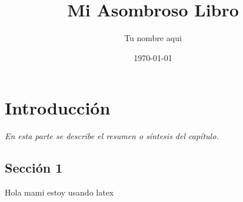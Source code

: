 \documentclass[]{book}
\title{\bf Mi Asombroso Libro}
\author{Tu nombre aqui}
\date{\today}
\begin{document}
\frontmatter
\maketitle
\tableofcontents
\mainmatter
\chapter{Introducción}
\begin{center}
\textit{En esta parte se describe el resumen o síntesis
del capítulo.}
\end{center}
\section{Sección 1}
Hola mami estoy usando latex 
\end{document}
